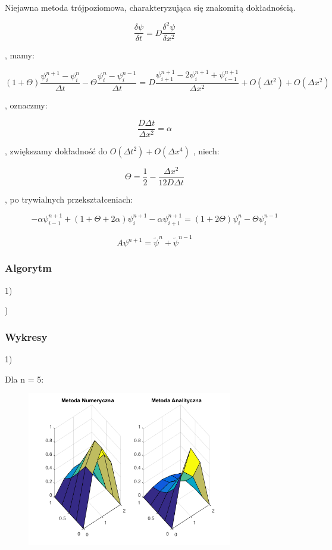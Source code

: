 Niejawna metoda trójpoziomowa, charakteryzująca się znakomitą dokładnością.

$$\dfrac{\delta \psi}{\delta t} = D\dfrac{\delta^2 \psi}{\delta x^2}$$

, mamy:

$$(1+\Theta)\dfrac{\psi^{n+1}_{i}-\psi^n_{i}}{\Delta t}-\Theta\dfrac{\psi^{n}_{i}-\psi^{n-1}_{i}}{\Delta t} = D \dfrac{\psi^{n+1}_{i+1}-2\psi^{n+1}_{i}+\psi^{n+1}_{i-1}}{\Delta x^2} + O(\Delta t^2) + O(\Delta x^2) $$

, oznaczmy:

$$\dfrac{D\Delta t}{\Delta x^2} = \alpha$$

, zwiększamy dokładność do  $O(\Delta t^2) + O(\Delta x^4)$ , niech:

$$\Theta = \frac{1}{2} - \dfrac{\Delta x^2}{12D\Delta t}$$

, po trywialnych przekształceniach:

$$-\alpha\psi^{n+1}_{i-1}+(1+\Theta + 2\alpha)\psi^{n+1}_{i}-\alpha\psi^{n+1}_{i+1}=(1+2\Theta)\psi^{n}_{i} - \Theta\psi^{n-1}_{i}$$

$$A\psi^{n+1}=\widetilde{\psi}^{n}+\widetilde{\psi}^{n-1}$$


\subsubsection{Algorytm}
1)

)

\newpage
\subsubsection{Wykresy}
1)

Dla n = 5:

\begin{figure}[!ht]
	\begin{center}
		\includegraphics[width=0.8\textwidth]{Lab7/charts/rm/5.png}
	\end{center}
\end{figure}

